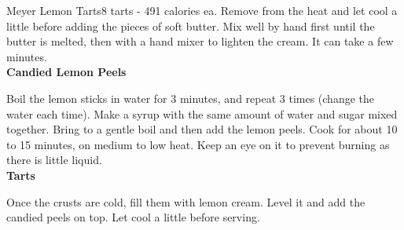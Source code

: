 \begin{recipe}{Meyer Lemon Tarts}{8 tarts - 491 calories ea.}{}
Remove from the heat and let cool a little before adding the pieces of soft butter. Mix well by hand first until the butter is melted, then with a hand mixer to lighten the cream. It can take a few minutes.\\

\textbf{Candied Lemon Peels}

Boil the lemon sticks in water for 3 minutes, and repeat 3 times (change the water each time). Make a syrup with the same amount of water and sugar mixed together. Bring to a gentle boil and then add the lemon peels. Cook for about 10 to 15 minutes, on medium to low heat. Keep an eye on it to prevent burning as there is little liquid.\\

\textbf{Tarts}

Once the crusts are cold, fill them with lemon cream. Level it and add the candied peels on top. Let cool a little before serving.

\end{recipe}